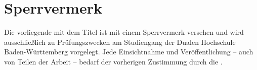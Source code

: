
\thispagestyle{empty}
\section*{Sperrvermerk}

\vspace*{2em}

Die vorliegende {\arbeit} mit dem Titel {\itshape \titel} ist mit einem Sperrvermerk versehen und wird ausschließlich zu Prüfungszwecken am Studiengang {\studiengang} der Dualen Hochschule Baden-Württemberg {\abgabeort} vorgelegt.
Jede Einsichtnahme und Veröffentlichung – auch von Teilen der Arbeit – bedarf der vorherigen Zustimmung durch die {\firma}.
